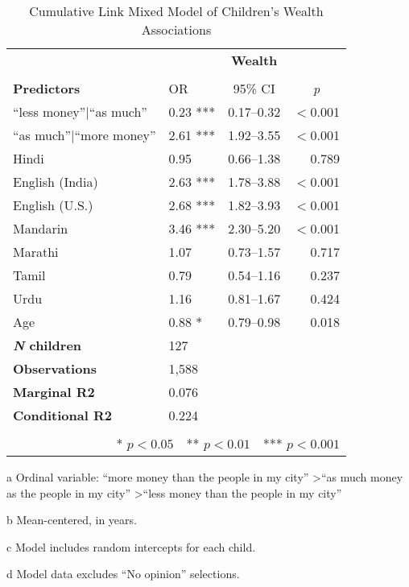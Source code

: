 \begin{table*}[t]
\small
\caption{Cumulative Link Mixed Model of Children's Wealth Associations}\label{tab:wealth-ord}
    \centering
    \vspace{5pt}
\begin{threeparttable}
\begin{tabular}{llcr}
 \toprule
& \multicolumn{3}{c}{\textbf{Wealth}\tnote{a}} \\
\cline{2-4} \\[-.75em]
\textbf{Predictors} & {OR} & {95\% CI} & \multicolumn{1}{c}{\textit{p}} \\ 
\midrule
``less money''$|$``as much'' & 0.23 *** & 0.17--0.32 & $<$0.001 \\ 
 ``as much''$|$``more money'' & 2.61 *** & 1.92--3.55 & $<$0.001 \\ 
 Hindi & 0.95 & 0.66--1.38 & 0.789 \\ 
 English (India) & 2.63 *** & 1.78--3.88 & $<$0.001 \\ 
 English (U.S.) & 2.68 *** & 1.82--3.93 & $<$0.001 \\ 
 Mandarin & 3.46 *** & 2.30--5.20 & $<$0.001 \\ 
 Marathi & 1.07 & 0.73--1.57 & 0.717 \\ 
 Tamil & 0.79 & 0.54--1.16 & 0.237 \\ 
 Urdu & 1.16 & 0.81--1.67 & 0.424 \\ 
 Age\tnote{b} & 0.88 * & 0.79--0.98 & 0.018 \\ 
\midrule
\bfseries{\textit{N} children}\tnote{c} & 127 & & \\ 
\textbf{Observations}\tnote{d} & 1,588 & &\\ 
 \textbf{Marginal R2} &  0.076 &&\\
 \textbf{Conditional R2} & 0.224 &  &  \\ 
\bottomrule\\[-.75em]
\multicolumn{4}{r}{* $p<0.05$~~** $p<0.01$~~*** $p<0.001$}\\
\end{tabular}
\begin{tablenotes}[flushleft]
    \item[a] Ordinal variable: ``more money than the people in my city'' \textgreater ``as much money as the people in my city'' \textgreater ``less money than the people in my city''
    \item[b] Mean-centered, in years.
    \item[c] Model includes random intercepts for each child.
    \item[d] Model data excludes ``No opinion'' selections. 
\end{tablenotes}
\end{threeparttable}
\end{table*}

